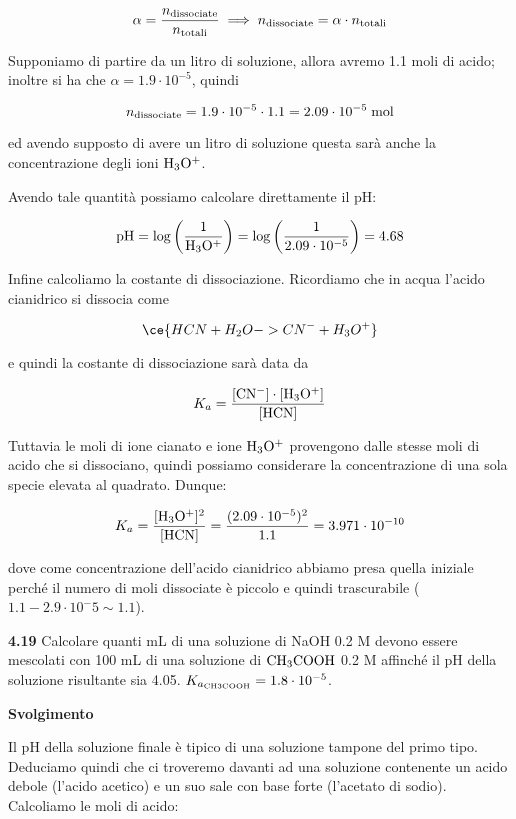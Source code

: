 $$\alpha=\frac{n_{\rm dissociate}}{n_{\rm totali}}
\implies
n_{\rm dissociate}=\alpha \cdot n_{\rm totali}$$

Supponiamo di partire da un litro di soluzione, allora avremo 1.1 moli di acido; inoltre si ha che $\alpha=1.9 \cdot 10^{-5}$, quindi

$$n_{\rm dissociate}=1.9 \cdot 10^{-5} \cdot 1.1
=2.09 \cdot 10^{-5} \; \rm mol$$

ed avendo supposto di avere un litro di soluzione questa sarà anche la concentrazione degli ioni $\rm H_3O^+$.

Avendo tale quantità possiamo calcolare direttamente il pH:

$$\rm pH=\log{\left(\frac{1}{H_3O^+}\right)}
=\log{\left(\frac{1}{2.09 \cdot 10^{-5}}\right)}=4.68$$

Infine calcoliamo la costante di dissociazione. Ricordiamo che in acqua l'acido cianidrico si dissocia come

$$\ce{HCN + H_2O -> CN^- + H_3O^+}$$

e quindi la costante di dissociazione sarà data da

$$K_a=\rm \frac{[CN^-]\cdot[H_3O^+]}{[HCN]}$$

Tuttavia le moli di ione cianato e ione $\rm H_3O^+$ provengono dalle stesse moli di acido che si dissociano, quindi possiamo considerare la concentrazione di una sola specie elevata al quadrato. Dunque:

$$K_a=\rm \frac{[H_3O^+]^2}{[HCN]}=\frac{(2.09 \cdot 10^{-5})^2}{1.1}=3.971 \cdot 10^{-10}$$

dove come concentrazione dell'acido cianidrico abbiamo presa quella iniziale perché il numero di moli dissociate è piccolo e quindi trascurabile ($1.1 - 2.9 \cdot 10^-5 \sim 1.1$).

\vspace{0.2cm}\textbf{4.19}  Calcolare quanti mL di una soluzione di NaOH 0.2 M devono essere mescolati con
100 mL di una soluzione di $\rm CH_3COOH$ 0.2 M affinché il pH della soluzione risultante sia 4.05. $K_{a_{\rm CH3COOH}}=1.8 \cdot 10^{-5}$.

\vspace{0.2cm}\large\textbf{Svolgimento}\normalsize

\vspace{0.2cm}Il pH della soluzione finale è tipico di una soluzione tampone del primo tipo. Deduciamo quindi che ci troveremo davanti ad una soluzione contenente un acido debole (l'acido acetico) e un suo sale con base forte (l'acetato di sodio). Calcoliamo le moli di acido:

